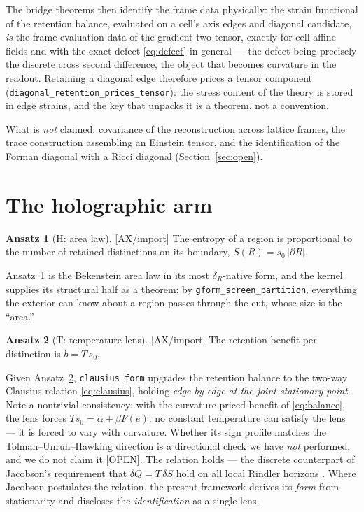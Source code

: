 \documentclass[10pt,twocolumn]{article}
\theoremstyle{definition}
\newtheorem{ansatz}{Ansatz}
\newcommand{\Ax}{\textsf{[AX/import]}}
\newcommand{\Open}{\textsf{[OPEN]}}
\newcommand{\code}[1]{\texttt{#1}}
\begin{document}
The bridge theorems then identify the frame data physically: the strain functional of
the retention balance, evaluated on a cell's axis edges and diagonal candidate,
\emph{is} the frame-evaluation data of the gradient two-tensor, exactly for
cell-affine fields and with the exact defect \eqref{eq:defect} in general --- the
defect being precisely the discrete cross second difference, the object that becomes
curvature in the readout. Retaining a diagonal edge therefore prices a tensor
component (\code{diagonal\_retention\_prices\_tensor}): the stress content of the
theory is stored in edge strains, and the key that unpacks it is a theorem, not a
convention.

What is \emph{not} claimed: covariance of the reconstruction across lattice frames,
the trace construction assembling an Einstein tensor, and the identification of the
Forman diagonal with a Ricci diagonal (Section~\ref{sec:open}).

\section{The holographic arm}\label{sec:holo}

\begin{ansatz}[H: area law]\label{an:H}
\Ax{} The entropy of a region is proportional to the number of retained distinctions
on its boundary, $S(R) = s_0\,\lvert\partial R\rvert$.
\end{ansatz}

Ansatz~\ref{an:H} is the Bekenstein area law in its most $\delta_R$-native form, and
the kernel supplies its structural half as a theorem: by
\code{gform\_screen\_partition}, everything the exterior can know about a region
passes through the cut, whose size is the ``area.''

\begin{ansatz}[T: temperature lens]\label{an:T}
\Ax{} The retention benefit per distinction is $b = T\,s_0$.
\end{ansatz}

Given Ansatz~\ref{an:T}, \code{clausius\_form} upgrades the retention balance to the
two-way Clausius relation \cite{clausius} \eqref{eq:clausius}, holding \emph{edge by edge at the joint
stationary point}. Note a nontrivial consistency: with the curvature-priced benefit of
\eqref{eq:balance}, the lens forces $T s_0 = \alpha+\beta F(e)$: no constant temperature can satisfy the lens
--- it is forced to vary with curvature. Whether its sign profile matches the
Tolman--Unruh--Hawking direction \cite{unruh,hawking} is a directional check we have
\emph{not} performed, and we do not claim it \Open{}. The relation holds --- the discrete counterpart of Jacobson's requirement that
$\delta Q = T\,\delta S$ hold on all local Rindler horizons \cite{jacobson}. Where
Jacobson postulates the relation, the present framework derives its \emph{form} from
stationarity and discloses the \emph{identification} as a single lens.
\end{document}
